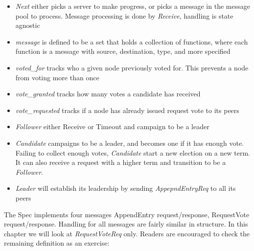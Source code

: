 \begin{tlatex}
\@pvspace{8.0pt}%
%
%
%
%
%
%
%
%
%
\@pvspace{8.0pt}%
%
%
%
%
%
%
\end{tlatex}

\begin{itemize}
    \item \textit{Next} either picks a server to make progress, or picks a
    message in the message pool to process. Message processing is done by
    \textit{Receive}, handling is state agnostic
    \item \textit{message} is defined to be a set that holds a collection of functions, where 
    each function is a message with source, destination, type, and more specified
    \item \textit{voted\_for} tracks who a given node previously voted for.
    This prevents a node from voting more than once
    \item \textit{vote\_granted} tracks how many votes a candidate has received
    \item \textit{vote\_requested} tracks if a node has already issued request
    vote to its peers
    \item \textit{Follower} either Receive or Timeout and campaign to be a leader
    \item \textit{Candidate} campaigns to be a leader, and becomes one if it has
    enough vote. Failing to collect enough votes, \textit{Candidate} start a new
    election on a new term. It can also receive a request with a higher term and
    transition to be a \textit{Follower}.
    \item \textit{Leader} will establish its leadership by sending
    \textit{AppepndEntryReq} to all its peers
\end{itemize}

The Spec implements four messages AppendEntry request/response, RequestVote
request/response. Handling for all messages are fairly similar in structure. In
this chapter we will look at \textit{RequestVoteReq} only. Readers are
encouraged to check the remaining definition as an exercise:\newline

